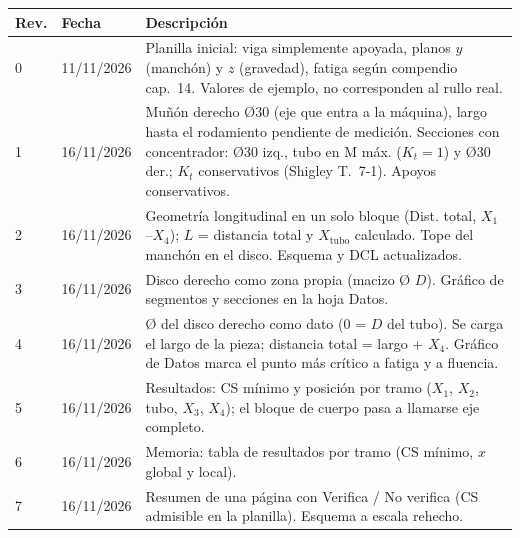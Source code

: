 \begin{center}
\begin{tabularx}{\textwidth}{llX}
\toprule
Rev. & Fecha & Descripción \\
\midrule
0 & 11/11/2026 & Planilla inicial: viga simplemente apoyada, planos $y$ (manchón) y $z$ (gravedad), fatiga según compendio cap.~14. Valores de ejemplo, no corresponden al rullo real. \\
1 & 16/11/2026 & Muñón derecho Ø30 (eje que entra a la máquina), largo hasta el rodamiento pendiente de medición. Secciones con concentrador: Ø30 izq., tubo en M máx. ($K_t=1$) y Ø30 der.; $K_t$ conservativos (Shigley T.~7-1). Apoyos conservativos. \\
2 & 16/11/2026 & Geometría longitudinal en un solo bloque (Dist. total, $X_1$--$X_4$); $L$ = distancia total y $X_{\text{tubo}}$ calculado. Tope del manchón en el disco. Esquema y DCL actualizados. \\
3 & 16/11/2026 & Disco derecho como zona propia (macizo Ø $D$). Gráfico de segmentos y secciones en la hoja Datos. \\
4 & 16/11/2026 & Ø del disco derecho como dato (0 = $D$ del tubo). Se carga el largo de la pieza; distancia total = largo + $X_4$. Gráfico de Datos marca el punto más crítico a fatiga y a fluencia. \\
5 & 16/11/2026 & Resultados: CS mínimo y posición por tramo ($X_1$, $X_2$, tubo, $X_3$, $X_4$); el bloque de cuerpo pasa a llamarse eje completo. \\
6 & 16/11/2026 & Memoria: tabla de resultados por tramo (CS mínimo, $x$ global y local). \\
7 & 16/11/2026 & Resumen de una página con Verifica / No verifica (CS admisible en la planilla). Esquema a escala rehecho. \\
\bottomrule
\end{tabularx}
\end{center}
